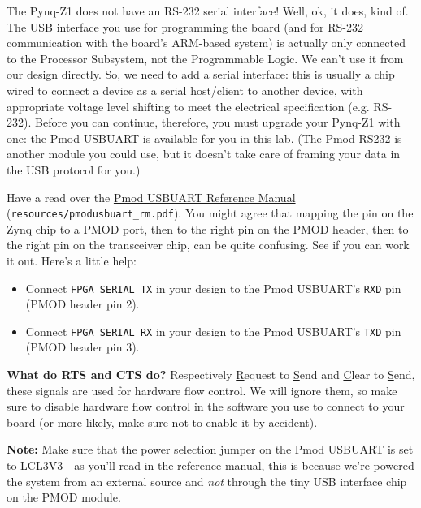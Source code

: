 \documentclass[11pt]{article}
\begin{document}
The Pynq-Z1 does not have an RS-232 serial interface! Well, ok, it does, kind of. The USB interface you use for programming the board (and for RS-232 communication with the board's ARM-based system) is actually only connected to the Processor Subsystem, not the Programmable Logic. We can't use it from our design directly. So, we need to add a serial interface: this is usually a chip wired to connect a device as a serial host/client to another device, with appropriate voltage level shifting to meet the electrical specification (e.g. RS-232). Before you can continue, therefore, you must upgrade your Pynq-Z1 with one: the \href{https://store.digilentinc.com/pmod-usbuart-usb-to-uart-interface/}{Pmod USBUART} is available for you in this lab. (The \href{https://store.digilentinc.com/pmod-rs232-serial-converter-and-interface-standard/}{Pmod RS232} is another module you could use, but it doesn't take care of framing your data in the USB protocol for you.)

Have a read over the \href{https://reference.digilentinc.com/reference/pmod/pmodusbuart/reference-manual}{Pmod USBUART Reference Manual} (\verb|resources/pmodusbuart_rm.pdf|). You might agree that mapping the pin on the Zynq chip to a PMOD port, then to the right pin on the PMOD header, then to the right pin on the transceiver chip, can be quite confusing. See if you can work it out. Here's a little help:

\begin{itemize}
  \item Connect \verb|FPGA_SERIAL_TX| in your design to the Pmod USBUART's \verb|RXD| pin (PMOD header pin 2).
  \item Connect \verb|FPGA_SERIAL_RX| in your design to the Pmod USBUART's \verb|TXD| pin (PMOD header pin 3).
\end{itemize}

\textbf{What do RTS and CTS do?} Respectively \underline{R}equest to \underline{S}end and \underline{C}lear to \underline{S}end, these signals are used for hardware flow control. We will ignore them, so make sure to disable hardware flow control in the software you use to connect to your board (or more likely, make sure not to enable it by accident).

\textbf{Note:} Make sure that the power selection jumper on the Pmod USBUART is set to LCL3V3 - as you'll read in the reference manual, this is because we're powered the system from an external source and \emph{not} through the tiny USB interface chip on the PMOD module.
\end{document}
